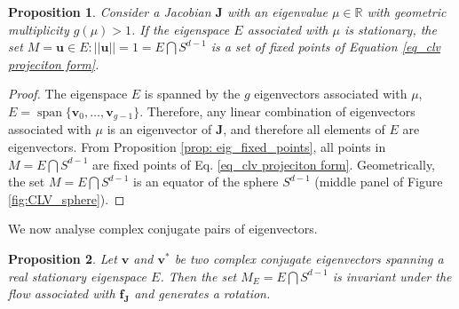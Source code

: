 \documentclass[aps,reprint,prx]{revtex4-2}
\newtheorem{proposition}{Proposition}
\begin{document}
\begin{proposition}
\label{proposition 2}
Consider a Jacobian $\mathbf{J}$ with an eigenvalue $\mu \in \mathbb{R}$ with geometric multiplicity $g(\mu)>1$. If the eigenspace $E$ associated with $\mu$ is stationary, the set $M = { \mathbf{u} \in E: ||\mathbf{u}|| = 1 } = E \bigcap S^{d-1}$ is a set of fixed points of Equation \eqref{eq_clv projeciton form}.
\end{proposition}

\begin{proof}
The eigenspace $E$ is spanned by the $g$ eigenvectors associated with $\mu$, $E = \operatorname{span} \{ \mathbf{v}_0, \dots, \mathbf{v}_{g-1} \}$.
Therefore, any linear combination of eigenvectors associated with $\mu$ is an eigenvector of $\mathbf{J}$, and therefore all elements of $E$ are eigenvectors.
From Proposition \ref{prop: eig_fixed_points}, all points in $M = E \bigcap S^{d-1}$ are fixed points of Eq. \eqref{eq_clv projeciton form}. Geometrically, the set $M = E \bigcap S^{d-1}$ is an equator of the sphere $S^{d-1}$ (middle panel of Figure \ref{fig:CLV_sphere}).
\end{proof}

We now analyse complex conjugate pairs of eigenvectors.

\begin{proposition}
\label{proposition 3}
Let $\mathbf{v}$ and ${\mathbf{v}^*}$ be two complex conjugate eigenvectors spanning a real stationary eigenspace $E$. Then the set $M_E = E \bigcap S^{d-1}$ is invariant under the flow associated with $\mathbf{f}_{\mathbf{J}}$ and generates a rotation.
\end{proposition}
\end{document}
